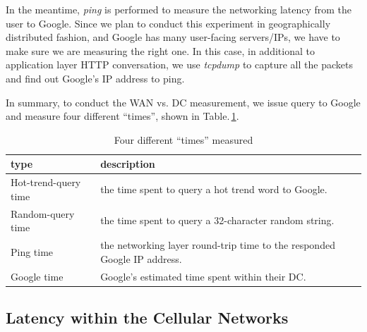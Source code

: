 In the meantime, {\it ping} is performed to measure the networking latency from the user to Google. Since we plan to conduct this experiment in geographically distributed fashion, and Google has many user-facing servers/IPs, we have to make sure we are measuring the right one. In this case, in additional to application layer HTTP conversation, we use {\it tcpdump} to capture all the packets and find out Google's IP address to ping.
 
In summary, to conduct the WAN vs. DC measurement, we issue query to Google and measure four different ``times'', shown in Table.\,\ref{tab:DC_method}.

\begin{table}
  \begin{tabular}{p{2.8cm} | p{5cm}}
    \hline
    type & description \\
    \hline
    Hot-trend-query time & the time spent to query a hot trend word to Google. \\
    Random-query time & the time spent to query a 32-character random string.  \\
    Ping time & the networking layer round-trip time to the responded Google IP address. \\
    Google time & Google's estimated time spent within their DC. \\
    \hline
  \end{tabular}
  \caption{Four different ``times'' measured}
  \label{tab:DC_method}
\end{table}


\subsection{Latency within the Cellular Networks}
\label{sec:latency-with-celull}




